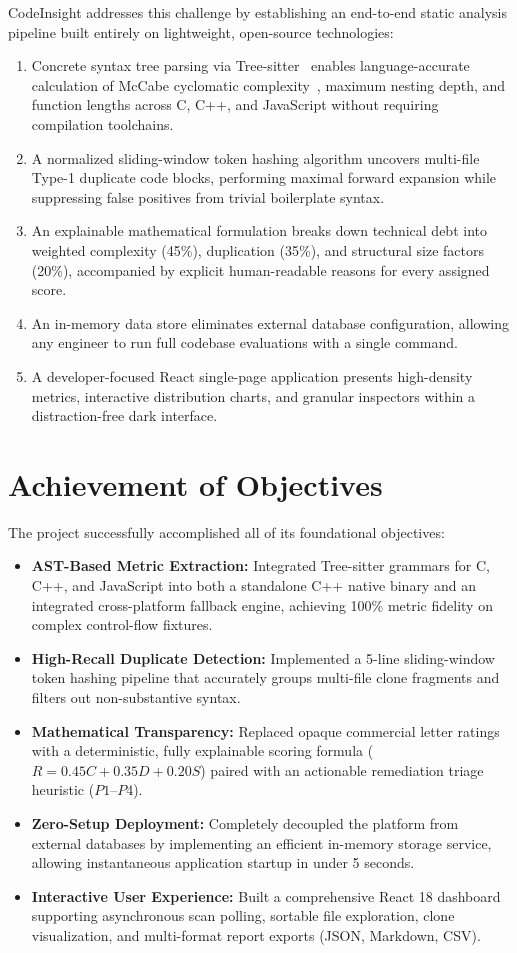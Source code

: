 CodeInsight addresses this challenge by establishing an end-to-end static analysis pipeline built entirely on lightweight, open-source technologies:
\begin{enumerate}
    \item Concrete syntax tree parsing via Tree-sitter~\cite{treesitter} enables language-accurate calculation of McCabe cyclomatic complexity~\cite{mccabe1976}, maximum nesting depth, and function lengths across C, C++, and JavaScript without requiring compilation toolchains.
    \item A normalized sliding-window token hashing algorithm uncovers multi-file Type-1 duplicate code blocks, performing maximal forward expansion while suppressing false positives from trivial boilerplate syntax.
    \item An explainable mathematical formulation breaks down technical debt into weighted complexity (45\%), duplication (35\%), and structural size factors (20\%), accompanied by explicit human-readable reasons for every assigned score.
    \item An in-memory data store eliminates external database configuration, allowing any engineer to run full codebase evaluations with a single command.
    \item A developer-focused React single-page application presents high-density metrics, interactive distribution charts, and granular inspectors within a distraction-free dark interface.
\end{enumerate}

\section{Achievement of Objectives}
The project successfully accomplished all of its foundational objectives:
\begin{itemize}
    \item \textbf{AST-Based Metric Extraction:} Integrated Tree-sitter grammars for C, C++, and JavaScript into both a standalone C++ native binary and an integrated cross-platform fallback engine, achieving 100\% metric fidelity on complex control-flow fixtures.
    \item \textbf{High-Recall Duplicate Detection:} Implemented a 5-line sliding-window token hashing pipeline that accurately groups multi-file clone fragments and filters out non-substantive syntax.
    \item \textbf{Mathematical Transparency:} Replaced opaque commercial letter ratings with a deterministic, fully explainable scoring formula ($R = 0.45C + 0.35D + 0.20S$) paired with an actionable remediation triage heuristic ($P1$--$P4$).
    \item \textbf{Zero-Setup Deployment:} Completely decoupled the platform from external databases by implementing an efficient in-memory storage service, allowing instantaneous application startup in under 5 seconds.
    \item \textbf{Interactive User Experience:} Built a comprehensive React 18 dashboard supporting asynchronous scan polling, sortable file exploration, clone visualization, and multi-format report exports (JSON, Markdown, CSV).
\end{itemize}

